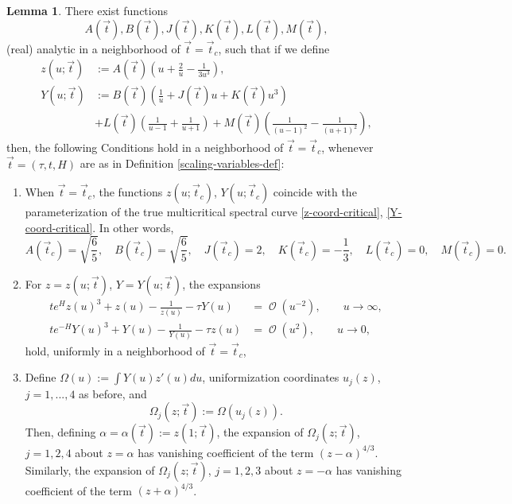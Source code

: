 \documentclass[usenames,dvipsnames]{article}
\theoremstyle{definition}
\newtheorem{lemma}{Lemma}[section]
\DeclareMathOperator{\OO}{\mathcal{O}}
\numberwithin{equation}{section}
\numberwithin{figure}{section}
\begin{document}
\begin{lemma}
   There exist functions 
     \begin{equation}
         A(\vec{t}), B(\vec{t}), J(\vec{t}), K(\vec{t}),
         L(\vec{t}), M(\vec{t}),
     \end{equation} 
     (real) analytic in a neighborhood of $\vec{t}=\vec{t}_c$, such that if we define
        \begin{align}
            z(u;\vec{t}) &:= A(\vec{t}) \left(u + \frac{2}{u} - \frac{1}{3u^3}\right), \label{z-mod-spectralcurve-1}\\
            Y(u;\vec{t}) &:= B(\vec{t}) \left(\frac{1}{u} + J(\vec{t}) u + K(\vec{t})u^3\right) \nonumber\\ &+ L(\vec{t})\left(\frac{1}{u-1} +\frac{1}{u+1} \right) + M(\vec{t}) \left(\frac{1}{(u-1)^2} - \frac{1}{(u+1)^2}\right),\label{z-mod-spectralcurve-2}
        \end{align}
then, the following Conditions hold in a neighborhood of $\vec{t}=\vec{t}_c$, whenever $\vec{t} = (\tau,t,H)$ are as in Definition \ref{scaling-variables-def}:

\begin{enumerate}
    \item[C1.] When $\vec{t}=\vec{t}_c$, the functions $z(u;\vec{t}_c)$, $Y(u;\vec{t}_c)$ coincide with the parameterization of the true multicritical spectral curve \eqref{z-coord-critical}, \eqref{Y-coord-critical}. In other words,
        \begin{equation}
            A(\vec{t}_c)=\sqrt{\frac{6}{5}}, \quad B(\vec{t}_c)=\sqrt{\frac{6}{5}}, \quad J(\vec{t}_c) = 2, \quad K(\vec{t}_c) = -\frac{1}{3}, \quad L(\vec{t}_c) = 0, \quad M(\vec{t}_c) = 0.
        \end{equation}
    \item[C2.] For $z = z(u;\vec{t})$, $Y = Y(u;\vec{t})$, the expansions
        \begin{align}
            te^{H} z(u)^3 + z(u) - \frac{1}{z(u)} -\tau Y(u) &= \OO(u^{-2}), \qquad u\to \infty,\\
            te^{-H} Y(u)^3 + Y(u) - \frac{1}{Y(u)} -\tau z(u) &= \OO(u^{2}), \qquad u\to 0,
        \end{align}
    hold, uniformly in a neighborhood of $\vec{t}=\vec{t}_c$,
    \item[C3.] Define $\Omega(u) := \int Y(u) z'(u) du$, uniformization coordinates $u_j(z)$, $j=1,...,4$ as
    before, and 
        \begin{equation}\label{modified-Omega-functions}
            \Omega_j(z;\vec{t}) := \Omega(u_j(z)).
        \end{equation}
    Then, defining $\alpha = \alpha(\vec{t}) := z(1;\vec{t})$, the expansion of $\Omega_j(z;\vec{t})$, $j=1,2,4$ about 
    $z = \alpha$ has vanishing coefficient of the term $(z-\alpha)^{4/3}$. Similarly, the expansion of $\Omega_j(z;\vec{t})$, $j=1,2,3$ about 
    $z = -\alpha$ has vanishing coefficient of the term $(z+\alpha)^{4/3}$.
\end{enumerate}
\end{lemma}
\end{document}
